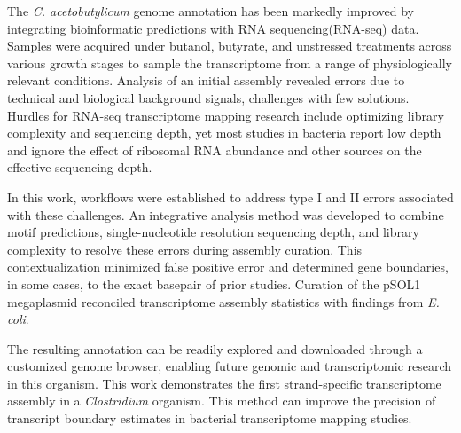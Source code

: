 

The {\it C. acetobutylicum} genome annotation has been markedly improved by integrating bioinformatic predictions with RNA sequencing(RNA-seq) data. Samples were acquired under butanol, butyrate, and unstressed treatments across various growth stages to sample the transcriptome from a range of physiologically relevant conditions. Analysis of an initial assembly revealed errors due to technical and biological background signals, challenges with few solutions. Hurdles for RNA-seq transcriptome mapping research include optimizing library complexity and sequencing depth, yet most studies in bacteria report low depth and ignore the effect of ribosomal RNA abundance and other sources on the effective sequencing depth. 

In this work, workflows were established to address type I and II errors associated with these challenges. An integrative analysis method was developed to combine motif predictions, single-nucleotide resolution sequencing depth, and library complexity to resolve these errors during assembly curation. This contextualization minimized false positive error and determined gene boundaries, in some cases, to the exact basepair of prior studies. Curation of the pSOL1 megaplasmid reconciled transcriptome assembly statistics with findings from \textit{E. coli}. 

The resulting annotation can be readily explored and downloaded through a customized genome browser, enabling future genomic and transcriptomic research in this organism. This work demonstrates the first strand-specific transcriptome assembly in a \textit{Clostridium} organism. This method can improve the precision of transcript boundary estimates in bacterial transcriptome mapping studies. 
